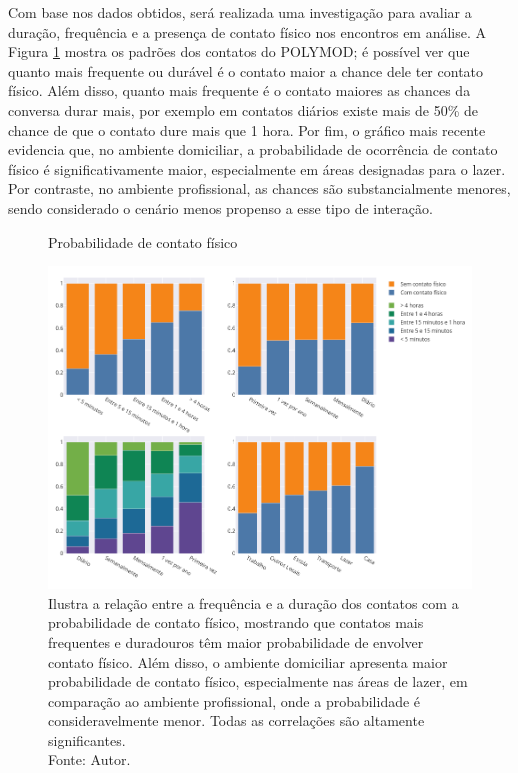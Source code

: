 Com base nos dados obtidos, será realizada uma investigação para avaliar a duração, frequência e a presença de contato físico nos encontros em análise. A Figura \ref{fig:graficos} mostra os padrões dos contatos do POLYMOD; é possível ver que quanto mais frequente ou durável é o contato maior a chance dele ter contato físico.
Além disso, quanto mais frequente é o contato maiores as chances da conversa durar mais, por exemplo em contatos diários existe mais de 50\% de chance de que o contato dure mais que 1 hora. Por fim, o gráfico mais recente evidencia que, no ambiente domiciliar, a probabilidade de ocorrência de contato físico é significativamente maior, especialmente em áreas designadas para o lazer. Por contraste, no ambiente profissional, as chances são substancialmente menores, sendo considerado o cenário menos propenso a esse tipo de interação.

\begin{figure}[H]
    \centering
    \captionsetup{font=normalsize,skip=0.8pt,singlelinecheck=on,labelsep=endash}
    \caption{Probabilidade de contato físico}
    \includegraphics[scale= 0.45]{figuras/graficos-PIF.png}
\captionsetup{font=small,justification=justified}
    \caption*{Ilustra a relação entre a frequência e a duração dos contatos com a probabilidade de contato físico, mostrando que contatos mais frequentes e duradouros têm maior probabilidade de envolver contato físico. Além disso, o ambiente domiciliar apresenta maior probabilidade de contato físico, especialmente nas áreas de lazer, em comparação ao ambiente profissional, onde a probabilidade é consideravelmente menor. Todas as correlações são altamente significantes.\\ Fonte: Autor.}
    \label{fig:graficos}
\end{figure}


